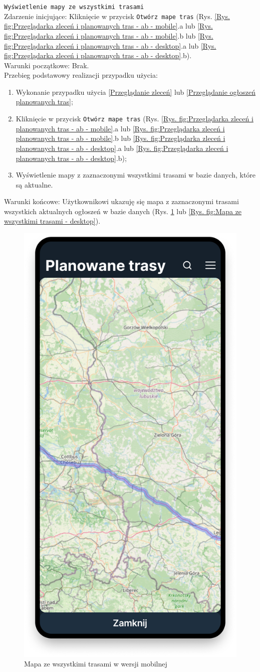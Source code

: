 \texttt{Wyświetlenie mapy ze wszystkimi trasami} \\
Zdarzenie inicjujące: Kliknięcie w przycisk \texttt{Otwórz mape tras} (Rys. \ref{Rys. fig:Przeglądarka zleceń i planowanych tras - ab - mobile}.a lub \ref{Rys. fig:Przeglądarka zleceń i planowanych tras - ab - mobile}.b lub \ref{Rys. fig:Przeglądarka zleceń i planowanych tras - ab - desktop}.a lub \ref{Rys. fig:Przeglądarka zleceń i planowanych tras - ab - desktop}.b). \\
Warunki początkowe: Brak. \\
Przebieg podstawowy realizacji przypadku użycia:
\begin{enumerate}
    \item Wykonanie przypadku użycia \ref{Przeglądanie zleceń} lub \ref{Przeglądanie ogłoszeń planowanych tras};
    \item Kliknięcie w przycisk \texttt{Otwórz mape tras} (Rys. \ref{Rys. fig:Przeglądarka zleceń i planowanych tras - ab - mobile}.a lub \ref{Rys. fig:Przeglądarka zleceń i planowanych tras - ab - mobile}.b lub \ref{Rys. fig:Przeglądarka zleceń i planowanych tras - ab - desktop}.a lub \ref{Rys. fig:Przeglądarka zleceń i planowanych tras - ab - desktop}.b);
    \item Wyświetlenie mapy z zaznaczonymi wszystkimi trasami w bazie danych, które są aktualne.
\end{enumerate}
Warunki końcowe: Użytkownikowi ukazuję się mapa z zaznaczonymi trasami wszystkich aktualnych ogłoszeń w bazie danych (Rys. \ref{Rys. fig:Mapa ze wszystkimi trasami - mobile} lub \ref{Rys. fig:Mapa ze wszystkimi trasami - desktop}).\\
\begin{figure}[H]
	\centering
		\includegraphics[width=0.3\linewidth]{rozdzial1/mapa_m.png}
	\caption{Mapa ze wszystkimi trasami w wersji mobilnej}
	\label{Rys. fig:Mapa ze wszystkimi trasami - mobile}
\end{figure}
